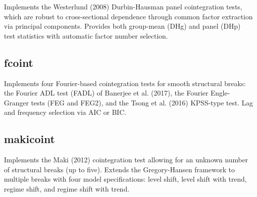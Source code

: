 Implements the Westerlund (2008) Durbin-Hausman panel cointegration
tests, which are robust to cross-sectional dependence through common
factor extraction via principal components. Provides both group-mean
(DHg) and panel (DHp) test statistics with automatic factor number
selection.

\begin{Shaded}
\begin{Highlighting}[]
\OtherTok{\textless{}{-}} \SpecialCharTok{\textasciitilde{}}\SpecialCharTok{+}
                     \NormalTok{, } \NormalTok{)}
\end{Highlighting}
\end{Shaded}

\subsection{fcoint}\label{fcoint}

Implements four Fourier-based cointegration tests for smooth structural
breaks: the Fourier ADL test (FADL) of Banerjee et al. (2017), the
Fourier Engle-Granger tests (FEG and FEG2), and the Tsong et al. (2016)
KPSS-type test. Lag and frequency selection via AIC or BIC.

\begin{Shaded}
\begin{Highlighting}[]
\OtherTok{\textless{}{-}}  \NormalTok{, } \NormalTok{, } \NormalTok{)}
\end{Highlighting}
\end{Shaded}

\subsection{makicoint}\label{makicoint}

Implements the Maki (2012) cointegration test allowing for an unknown
number of structural breaks (up to five). Extends the Gregory-Hansen
framework to multiple breaks with four model specifications: level
shift, level shift with trend, regime shift, and regime shift with
trend.

